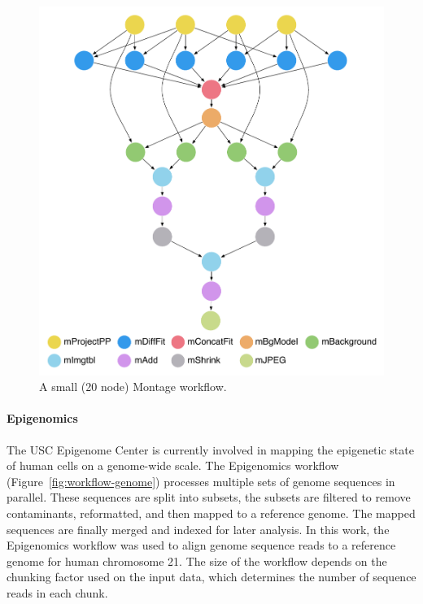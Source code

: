 \begin{figure}[!t]
	\centering
	\includegraphics[width=0.85\linewidth]{figures/workflow-montage}
	\caption{A small (20 node) Montage workflow.}
	\label{fig:workflow-montage}
\end{figure}


\paragraph{\textbf{Epigenomics}}
The USC Epigenome Center is currently involved in mapping the epigenetic 
state of human cells on a genome-wide scale. The Epigenomics workflow 
(Figure~\ref{fig:workflow-genome}) processes multiple sets of genome sequences in
parallel. These sequences are split into subsets, the subsets are filtered to remove
contaminants, reformatted, and then mapped to a reference genome. The mapped sequences are
finally merged and indexed for later analysis. In this work, the Epigenomics workflow was 
used to align genome sequence reads to a reference genome for human chromosome 
21. The size of the workflow depends on the chunking factor used on the input data, 
which determines the number of sequence reads in each chunk.


